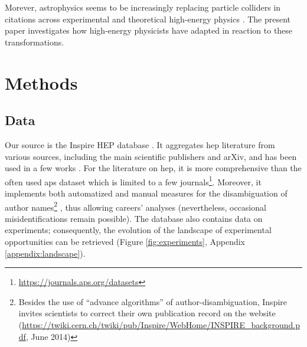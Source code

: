 \documentclass{article}
\begin{document}
Morever, astrophysics seems to be increasingly replacing particle colliders in citations across experimental and theoretical high-energy physics \citep{Gautheron2023}. %
The present paper investigates how high-energy physicists have adapted in reaction to these transformations. %

\section{\label{sec:methods}Methods}

\subsection{\label{sec:data}Data}

Our source is the Inspire HEP database \citep{InspireAPI}. It aggregates \gls{hep} literature from various sources, including the main scientific publishers and arXiv, and has been used in a few works \citep{Gautheron2023,Perovi2016,Chall2019a,Strumia2021,Sikimi2022}. For the literature on \gls{hep}, it is more comprehensive than the often used \gls{aps} dataset which is limited to a few journals\footnote{\url{https://journals.aps.org/datasets}}. %
Moreover, it implements both automatized and manual measures for the disambiguation of author names\footnote{Besides the use of ``advance algorithms'' of author-disambiguation, Inspire invites scientists to correct their own publication record on the website (\url{https://twiki.cern.ch/twiki/pub/Inspire/WebHome/INSPIRE_background.pdf}, June 2014)} %
, thus allowing careers' analyses \citep{Strumia2021} (nevertheless, occasional misidentifications remain possible). The database also contains data on experiments; consequently, the evolution of the landscape of experimental opportunities can be retrieved (Figure \ref{fig:experiments}, Appendix \ref{appendix:landscape}). %
\end{document}
